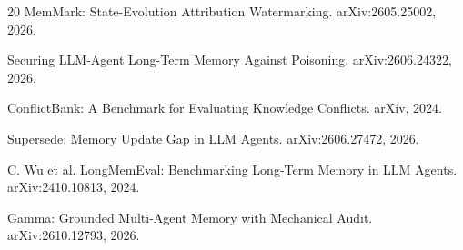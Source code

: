 \documentclass[sigconf]{acmart}
\begin{document}
\begin{thebibliography}{20}
 MemMark: State-Evolution Attribution Watermarking. arXiv:2605.25002, 2026.

 Securing LLM-Agent Long-Term Memory Against Poisoning. arXiv:2606.24322, 2026.

 ConflictBank: A Benchmark for Evaluating Knowledge Conflicts. arXiv, 2024.

 Supersede: Memory Update Gap in LLM Agents. arXiv:2606.27472, 2026.

 C. Wu et al. LongMemEval: Benchmarking Long-Term Memory in LLM Agents. arXiv:2410.10813, 2024.

 Gamma: Grounded Multi-Agent Memory with Mechanical Audit. arXiv:2610.12793, 2026.

\end{thebibliography}
\end{document}
